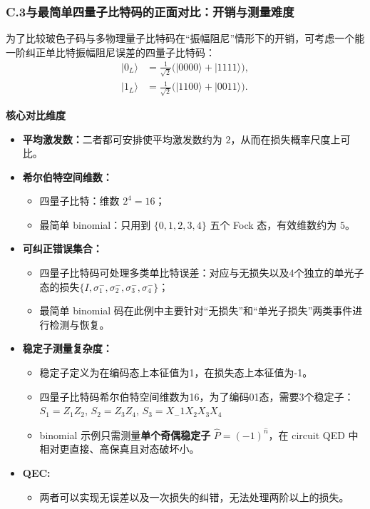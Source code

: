 \documentclass[12pt,a4paper,oneside]{ctexbook}
\begin{document}
\subsubsection{C.3\quad 与最简单四量子比特码的正面对比：开销与测量难度}

为了比较玻色子码与多物理量子比特码在“振幅阻尼”情形下的开销，可考虑一个能一阶纠正单比特振幅阻尼误差的四量子比特码：
\begin{align}
  |0_L\rangle &= \frac{1}{\sqrt{2}}\big(|0000\rangle+|1111\rangle\big), \tag{155a}\\
  |1_L\rangle &= \frac{1}{\sqrt{2}}\big(|1100\rangle+|0011\rangle\big). \tag{155b}
\end{align}

\noindent\textbf{核心对比维度}

\begin{itemize}
  \item \textbf{平均激发数：}二者都可安排使平均激发数约为 $2$，从而在损失概率尺度上可比。
  \item \textbf{希尔伯特空间维数：}
  \begin{itemize}
    \item 四量子比特：维数 $2^4=16$；
    \item 最简单 binomial：只用到 $\{0,1,2,3,4\}$ 五个 Fock 态，有效维数约为 $5$。
  \end{itemize}
  \item \textbf{可纠正错误集合：}
  \begin{itemize}
    \item 四量子比特码可处理多类单比特误差：对应与无损失以及4个独立的单光子态的损失$\{I, \sigma_1^-,\sigma_2^-,\sigma_3^-,\sigma_4^-\}$；
    \item 最简单 binomial 码在此例中主要针对“无损失”和“单光子损失”两类事件进行检测与恢复。
  \end{itemize}
  \item \textbf{稳定子测量复杂度：}
  \begin{itemize}
    \item 稳定子定义为在编码态上本征值为1，在损失态上本征值为-1。
    \item 四量子比特码希尔伯特空间维数为16，为了编码01态，需要3个稳定子：$S_1 = Z_1Z_2$, $S_2 = Z_3Z_4$, $S_3 = X_-1X_2X_3X_4$
    \item binomial 示例只需测量\textbf{单个奇偶稳定子} $\hat P=(-1)^{\hat n}$，在 circuit QED 中相对更直接、高保真且对态破坏小。
  \end{itemize}
  \item \textbf{QEC:}
  \begin{itemize}
    \item 两者可以实现无误差以及一次损失的纠错，无法处理两阶以上的损失。
  \end{itemize}
\end{itemize}
\end{document}
